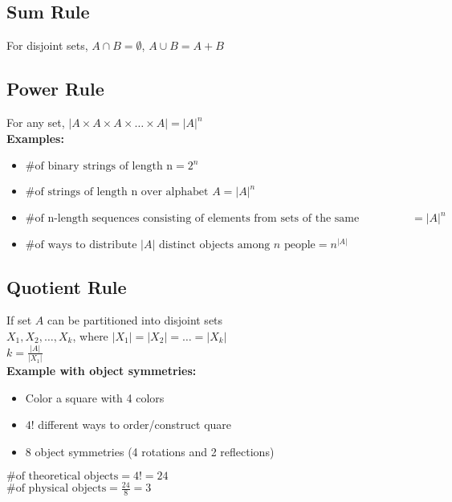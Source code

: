\documentclass{article}
\begin{document}
\begin{spacing}{1.5}
\subsection{Sum Rule}
\label{sec:sum}
For disjoint sets, $A \cap B = \emptyset$, $A \cup B = A + B$
%
\subsection{Power Rule}
\label{sec:power}
For any set, $|A \times A \times A \times \dots \times A| = |A|^{n}$\\
\textbf{Examples:}
\begin{itemize}
    \item $\text{\# of binary strings of length n} = 2^n$
    \item $\text{\# of strings of length n over alphabet } A = |A|^n$
    \item $\text{\# of n-length sequences consisting of elements from sets of the same cardinality} = |A|^{n}$
    \item $\text{\# of ways to distribute $|A|$ distinct objects among $n$ people} = n^{|A|}$
\end{itemize}
%
\subsection{Quotient Rule}
\label{sec:quotient}
If set $A$ can be partitioned into disjoint sets\\
$X_1, X_2, \dots, X_k$, where $|X_1| = |X_2| = \dots = |X_k|$\\
$k= \frac{|A|}{|X_1|}$\\
\textbf{Example with object symmetries:}
\begin{itemize}
    \item Color a square with 4 colors
    \item $4!$ different ways to order/construct quare
    \item 8 object symmetries (4 rotations and 2 reflections)
\end{itemize}
$\text{\# of theoretical objects} = 4! = 24$\\
$\text{\# of physical objects} = \frac{24}{8} = 3$
%

\end{spacing}
\end{document}
